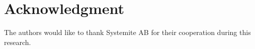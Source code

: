 \documentclass[conference]{IEEEtran}
\begin{document}



\section*{Acknowledgment}

The authors would like to thank Systemite AB for their cooperation during this research. 

 





%
%
%








\end{document}

